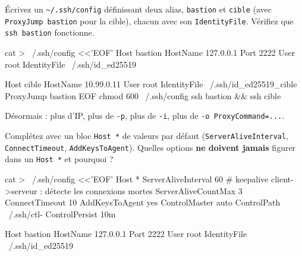 \documentclass[a4paper,10pt]{exam}
\begin{document}
\begin{questions}
\question Écrivez un \texttt{\textasciitilde/.ssh/config} définissant deux alias,
\texttt{bastion} et \texttt{cible} (avec \texttt{ProxyJump bastion} pour la cible),
chacun avec son \texttt{IdentityFile}. Vérifiez que \texttt{ssh bastion} fonctionne.
\begin{solution}
\begin{bashcode}
cat > ~/.ssh/config <<'EOF'
Host bastion
    HostName 127.0.0.1
    Port 2222
    User root
    IdentityFile ~/.ssh/id_ed25519

Host cible
    HostName 10.99.0.11
    User root
    IdentityFile ~/.ssh/id_ed25519_cible
    ProxyJump bastion
EOF
chmod 600 ~/.ssh/config
ssh bastion && ssh cible
\end{bashcode}
Désormais : plus d'IP, plus de \texttt{-p}, plus de \texttt{-i}, plus de
\texttt{-o ProxyCommand=...}.
\end{solution}
\question Complétez avec un bloc \texttt{Host *} de valeurs par défaut
(\texttt{ServerAliveInterval}, \texttt{ConnectTimeout}, \texttt{AddKeysToAgent}).
Quelles options \textbf{ne doivent jamais} figurer dans un \texttt{Host *} et pourquoi ?
\begin{solution}
\begin{bashcode}
cat > ~/.ssh/config <<'EOF'
Host *
    ServerAliveInterval 60        # keepalive client->serveur : détecte les connexions mortes
    ServerAliveCountMax 3
    ConnectTimeout 10
    AddKeysToAgent yes
    ControlMaster auto
    ControlPath ~/.ssh/ctl-%
    ControlPersist 10m

Host bastion
    HostName 127.0.0.1
    Port 2222
    User root
    IdentityFile ~/.ssh/id_ed25519


\end{bashcode}
\end{solution}
\end{questions}
\end{document}
